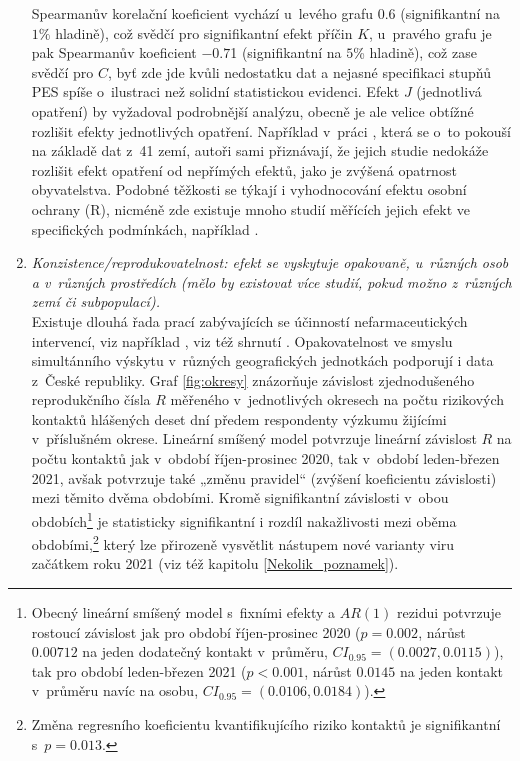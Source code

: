 \begin{enumerate}
Spearmanův korelační koeficient
vychází u~levého grafu $0.6$ (signifikantní na $1\%$ hladině), což svědčí pro
signifikantní efekt příčin $K$, u~pravého grafu je pak Spearmanův koeficient $-0.7$1 (signifikantní na $5$\% hladině), což zase svědčí pro $C$, byť zde jde kvůli nedostatku dat a nejasné specifikaci stupňů PES spíše o~ilustraci než solidní statistickou evidenci. Efekt $J$ (jednotlivá opatření)
by vyžadoval podrobnější analýzu, obecně je ale velice obtížné rozlišit efekty
jednotlivých opatření. Například v~práci \cite{Brauner_etal2020},
která se o~to pokouší na základě dat z~41 zemí, autoři sami přiznávají,
že jejich studie nedokáže rozlišit efekt opatření od nepřímých efektů,
jako je zvýšená opatrnost obyvatelstva. Podobné těžkosti se týkají
i vyhodnocování efektu osobní ochrany (R), nicméně zde existuje mnoho
studií měřících jejich efekt ve specifických podmínkách, například \cite{chu2020physical}.
\item \emph{Konzistence/reprodukovatelnost: efekt se vyskytuje opakovaně,
u~různých osob a v~různých prostředích (mělo by existovat více studií,
pokud možno z~různých zemí či subpopulací).}\\
Existuje dlouhá řada prací zabývajících se 
účinností nefarmaceutických intervencí, viz například \cite{flaxman2020estimating},
viz též shrnutí \cite{kluveitOpat}. 
Opakovatelnost ve smyslu simultánního výskytu v~různých geografických jednotkách podporují i data z~České republiky. Graf \ref{fig:okresy} znázorňuje závislost zjednodušeného reprodukčního čísla $R$ měřeného v~jednotlivých okresech na počtu rizikových kontaktů hlášených deset dní předem respondenty výzkumu \cite{paqcovid} žijícími v~příslušném okrese. Lineární smíšený model potvrzuje lineární závislost $R$ na počtu kontaktů jak v~období říjen-prosinec 2020, tak v~období leden-březen 2021, avšak potvrzuje také „změnu pravidel“ (zvýšení koeficientu závislosti) mezi těmito dvěma obdobími. Kromě signifikantní závislosti v~obou obdobích\footnote{Obecný lineární smíšený model s~fixními efekty a $AR(1)$ rezidui potvrzuje rostoucí závislost jak pro období říjen-prosinec 2020 ($p=0.002$, nárůst $0.00712$ na jeden dodatečný kontakt v~průměru, $CI_{0.95}=(0.0027,0.0115)$), tak pro období leden-březen 2021 ($p<0.001$, nárůst $0.0145$ na jeden kontakt v~průměru navíc na osobu, $CI_{0.95}=(0.0106,0.0184)$).} je statisticky signifikantní i rozdíl nakažlivosti mezi oběma obdobími,\footnote{Změna regresního koeficientu kvantifikujícího riziko kontaktů je signifikantní s~$p=0.013$.} který lze přirozeně vysvětlit nástupem nové varianty viru začátkem roku 2021 (viz též kapitolu \ref{Nekolik_poznamek}).



\end{enumerate}
